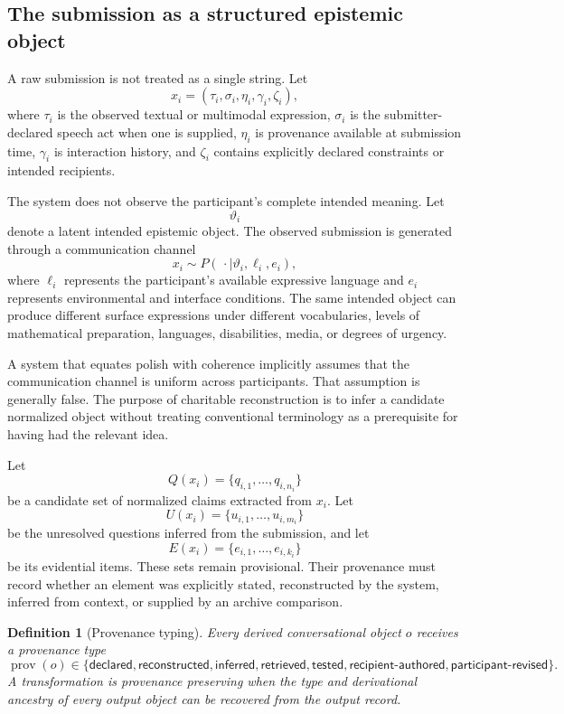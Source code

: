 \documentclass[11pt]{article}
\newtheorem{definition}{Definition}[section]
\theoremstyle{definition}
\begin{document}
\subsection{The submission as a structured epistemic object}

A raw submission is not treated as a single string. Let
\[
x_i
=
(\tau_i,\sigma_i,\eta_i,\gamma_i,\zeta_i),
\]
where \(\tau_i\) is the observed textual or multimodal expression, \(\sigma_i\) is the submitter-declared speech act when one is supplied, \(\eta_i\) is provenance available at submission time, \(\gamma_i\) is interaction history, and \(\zeta_i\) contains explicitly declared constraints or intended recipients.

The system does not observe the participant's complete intended meaning. Let
\[
\vartheta_i
\]
denote a latent intended epistemic object. The observed submission is generated through a communication channel
\[
x_i \sim P(\,\cdot\mid \vartheta_i,\ell_i,e_i),
\]
where \(\ell_i\) represents the participant's available expressive language and \(e_i\) represents environmental and interface conditions. The same intended object can produce different surface expressions under different vocabularies, levels of mathematical preparation, languages, disabilities, media, or degrees of urgency.

A system that equates polish with coherence implicitly assumes that the communication channel is uniform across participants. That assumption is generally false. The purpose of charitable reconstruction is to infer a candidate normalized object without treating conventional terminology as a prerequisite for having had the relevant idea.

Let
\[
Q(x_i)
=
\{q_{i,1},\ldots,q_{i,n_i}\}
\]
be a candidate set of normalized claims extracted from \(x_i\). Let
\[
U(x_i)
=
\{u_{i,1},\ldots,u_{i,m_i}\}
\]
be the unresolved questions inferred from the submission, and let
\[
E(x_i)
=
\{e_{i,1},\ldots,e_{i,k_i}\}
\]
be its evidential items. These sets remain provisional. Their provenance must record whether an element was explicitly stated, reconstructed by the system, inferred from context, or supplied by an archive comparison.

\begin{definition}[Provenance typing]
Every derived conversational object \(o\) receives a provenance type
\[
\operatorname{prov}(o)
\in
\{
\mathsf{declared},
\mathsf{reconstructed},
\mathsf{inferred},
\mathsf{retrieved},
\mathsf{tested},
\mathsf{recipient\text{-}authored},
\mathsf{participant\text{-}revised}
\}.
\]
A transformation is provenance preserving when the type and derivational ancestry of every output object can be recovered from the output record.
\end{definition}
\end{document}
